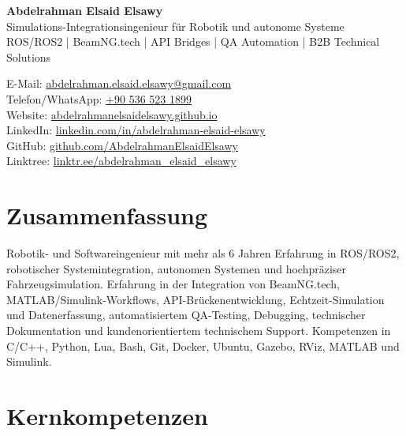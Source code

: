 \documentclass[11pt,a4paper]{article}
\begin{document}
{\LARGE \textbf{Abdelrahman Elsaid Elsawy}}\\
Simulations-Integrationsingenieur für Robotik und autonome Systeme\\
ROS/ROS2 | BeamNG.tech | API Bridges | QA Automation | B2B Technical Solutions

E-Mail: \href{mailto:abdelrahman.elsaid.elsawy@gmail.com}{abdelrahman.elsaid.elsawy@gmail.com}\\
Telefon/WhatsApp: \href{https://wa.me/905365231899}{+90 536 523 1899}\\
Website: \href{https://abdelrahmanelsaidelsawy.github.io/index.html}{abdelrahmanelsaidelsawy.github.io}\\
LinkedIn: \href{https://www.linkedin.com/in/abdelrahman-elsaid-elsawy}{linkedin.com/in/abdelrahman-elsaid-elsawy}\\
GitHub: \href{https://github.com/AbdelrahmanElsaidElsawy}{github.com/AbdelrahmanElsaidElsawy}\\
Linktree: \href{https://linktr.ee/abdelrahman_elsaid_elsawy}{linktr.ee/abdelrahman\_elsaid\_elsawy}

\section*{Zusammenfassung}

Robotik- und Softwareingenieur mit mehr als 6 Jahren Erfahrung in ROS/ROS2, robotischer Systemintegration, autonomen Systemen und hochpräziser Fahrzeugsimulation. Erfahrung in der Integration von BeamNG.tech, MATLAB/Simulink-Workflows, API-Brückenentwicklung, Echtzeit-Simulation und Datenerfassung, automatisiertem QA-Testing, Debugging, technischer Dokumentation und kundenorientiertem technischem Support. Kompetenzen in C/C++, Python, Lua, Bash, Git, Docker, Ubuntu, Gazebo, RViz, MATLAB und Simulink.

\section*{Kernkompetenzen}
\end{document}
